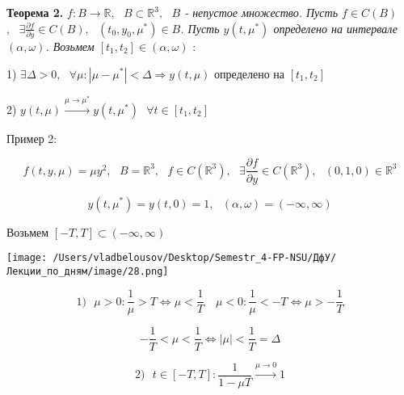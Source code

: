 \documentclass[12pt, a4paper]{report}
\begin{document}
\begin{flushleft}
    \textbf{Теорема 2.} \textit{ \( f : B \to  \mathbb{R} , \text{ }  B \subset \mathbb{R} ^3 , \text{ } B  \) - непустое множество. Пусть  \( f \in  C(B ) \) \( \displaystyle  , \text{ } \exists  \frac{ \partial  f }{\partial  y } \in  C (B ) , \text{ }  (t_0, y_0 , \mu^* ) \in  B  \). Пусть \( y (t,\mu^* ) \) определено на  интервале \( (\alpha, \omega) \). Возьмем \( [t_1, t_2 ] \in  (\alpha , \omega) \)   }:  
    
    1) \( \exists  \Delta > 0 , \text{ }  \forall  \mu : |\mu - \mu^*   | < \Delta \Rightarrow y ( t, \mu ) \textit{ определено на } [t_1,t_2 ]  \) 

    2) \(  y(t,\mu ) \xrightarrow{\mu \to  \mu^* } y(t, \mu^*)   \text{ } \forall  t \in  [t_1,t_2 ]\) 
\end{flushleft}

Пример 2: 

\[ f(t, y ,\mu ) = \mu y ^2 , \text{ }  B = \mathbb{R} ^3 , \text{ }  f \in  C ( \mathbb{R} ^3 ) , \text{  } \exists  \frac{\partial  f }{\partial  y } \in  C (\mathbb{R} ^3 ) , \text{ }  ( 0,1,0 ) \in \mathbb{R} ^3   \] 

\[ y(t, \mu ^ * ) = y ( t, 0 ) = 1 , \text{ }  (\alpha , \omega ) = ( - \infty  , \infty ) \] 

Возьмем \( [-T, T ] \subset ( - \infty  , \infty  ) \) 

\begin{center}
    \texttt{[image: /Users/vladbelousov/Desktop/Semestr\_4-FP-NSU/ДфУ/Лекции\_по\_дням/image/28.png]}
\end{center}

\[1) \text{ }  \mu > 0 : \frac{1}{\mu } > T \Leftrightarrow  \mu < \frac{1}{T  }  \quad  \mu < 0 : \frac{1}{\mu } < -T \Leftrightarrow \mu>  - \frac{1}{T }       \] 

\[ - \frac{1}{T }  < \mu < \frac{1}{ T }  \Leftrightarrow  |\mu     | < \frac{1}{T   } = \Delta   \] 

\[ 2) \text{ }  t \in [- T , T ] : \frac{1}{1 - \mu T } \xrightarrow{ \mu \to  0 } 1     \] 
\end{document}
